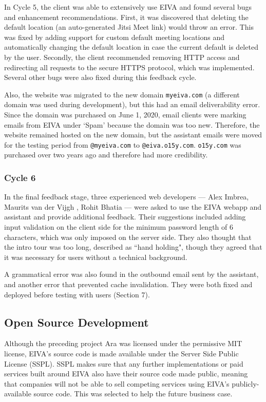 \documentclass{article}
\begin{document}
In Cycle 5, the client was able to extensively use EIVA and found several bugs and enhancement recommendations. First, it was discovered that deleting the default location (an auto-generated Jitsi Meet link) would throw an error. This was fixed by adding support for custom default meeting locations and automatically changing the default location in case the current default is deleted by the user. Secondly, the client recommended removing HTTP access and redirecting all requests to the secure HTTPS protocol, which was implemented. Several other bugs were also fixed during this feedback cycle.

Also, the website was migrated to the new domain \texttt{myeiva.com} (a different domain was used during development), but this had an email deliverability error. Since the domain was purchased on June 1, 2020, email clients were marking emails from EIVA under `Spam' because the domain was too new. Therefore, the website remained hosted on the new domain, but the assistant emails were moved for the testing period from \texttt{@myeiva.com} to \texttt{@eiva.o15y.com}. \texttt{o15y.com} was purchased over two years ago and therefore had more credibility.

\subsubsection{Cycle 6}

In the final feedback stage, three experienced web developers --- Alex Imbrea, Maurits van der Vijgh , Rohit Bhatia --- were asked to use the EIVA webapp and assistant and provide additional feedback. Their suggestions included adding input validation on the client side for the minimum password length of 6 characters, which was only imposed on the server side. They also thought that the intro tour was too long, described as ``hand holding", though they agreed that it was necessary for users without a technical background.

A grammatical error was also found in the outbound email sent by the assistant, and another error that prevented cache invalidation. They were both fixed and deployed before testing with users (Section 7).

\subsection{Open Source Development}

Although the preceding project Ara was licensed under the permissive MIT license, EIVA's source code is made available under the Server Side Public License (SSPL). SSPL makes sure that any further implementations or paid services built around EIVA also have their source code made public, meaning that companies will not be able to sell competing services using EIVA's publicly-available source code. This was selected to help the future business case.
\end{document}
